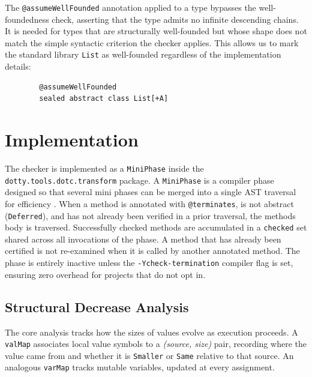 The \texttt{@assumeWellFounded} annotation applied to a type bypasses the
well-foundedness check, asserting that the type admits no infinite descending
chains. It is needed for types that are structurally well-founded but whose
shape does not match the simple syntactic criterion the checker applies.
This allows us to mark the standard library \texttt{List} as well-founded
regardless of the implementation details:
\begin{verbatim}
        @assumeWellFounded
        sealed abstract class List[+A]
\end{verbatim}

\chapter{Implementation}

The checker is implemented as a \texttt{MiniPhase} inside the
\texttt{dotty.tools.dotc.transform} package.
A \texttt{MiniPhase} is a compiler phase designed so that several mini phases
can be merged into a single AST traversal for efficiency \cite{MiniPhase}.
When a method is annotated with \texttt{@terminates}, is not abstract
(\texttt{Deferred}), and has not already been verified in a prior traversal, the
methods body is traversed. Successfully checked methods are accumulated in a
\texttt{checked} set shared across all invocations of the phase. A method that
has already been certified is not re-examined when it is called by another
annotated method. The phase is entirely inactive unless the
\texttt{-Ycheck-termination} compiler flag is set, ensuring zero overhead for
projects that do not opt in.

\section{Structural Decrease Analysis}
The core analysis tracks how the sizes of values evolve as execution proceeds.
A \texttt{valMap} associates local value symbols to a \emph{(source, size)}
pair, recording where the value came from and whether it is \texttt{Smaller}
or \texttt{Same} relative to that source. An analogous \texttt{varMap} tracks
mutable variables, updated at every assignment.

